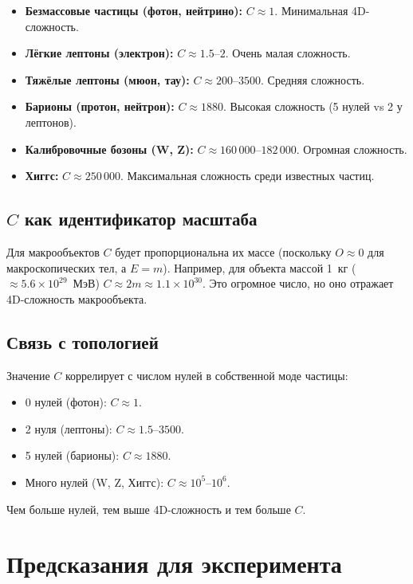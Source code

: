 \documentclass[12pt,a4paper]{article}
\begin{document}
\begin{itemize}
    \item \textbf{Безмассовые частицы (фотон, нейтрино):} $C \approx 1$. Минимальная 4D-сложность.
    \item \textbf{Лёгкие лептоны (электрон):} $C \approx 1.5$--$2$. Очень малая сложность.
    \item \textbf{Тяжёлые лептоны (мюон, тау):} $C \approx 200$--$3500$. Средняя сложность.
    \item \textbf{Барионы (протон, нейтрон):} $C \approx 1880$. Высокая сложность (5 нулей vs 2 у лептонов).
    \item \textbf{Калибровочные бозоны (W, Z):} $C \approx 160\,000$--$182\,000$. Огромная сложность.
    \item \textbf{Хиггс:} $C \approx 250\,000$. Максимальная сложность среди известных частиц.
\end{itemize}

\subsection{$C$ как идентификатор масштаба}

Для макрообъектов $C$ будет пропорциональна их массе (поскольку $O \approx 0$ для макроскопических тел, а $E = m$). Например, для объекта массой 1~кг ($\approx 5.6 \times 10^{29}$~МэВ) $C \approx 2m \approx 1.1 \times 10^{30}$. Это огромное число, но оно отражает 4D-сложность макрообъекта.

\subsection{Связь с топологией}

Значение $C$ коррелирует с числом нулей в собственной моде частицы:

\begin{itemize}
    \item 0 нулей (фотон): $C \approx 1$.
    \item 2 нуля (лептоны): $C \approx 1.5$--$3500$.
    \item 5 нулей (барионы): $C \approx 1880$.
    \item Много нулей (W, Z, Хиггс): $C \approx 10^5$--$10^6$.
\end{itemize}

Чем больше нулей, тем выше 4D-сложность и тем больше $C$.

\section{Предсказания для эксперимента}
\end{document}
